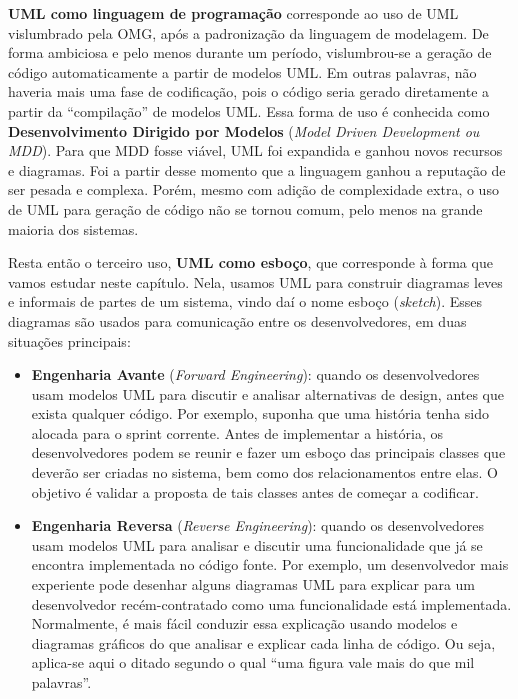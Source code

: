 \documentclass[
  11pt,
  twoside]{book}
\begin{document}
 \textbf{UML como linguagem de
programação} corresponde ao uso de UML vislumbrado pela OMG, após a
padronização da linguagem de modelagem. De forma ambiciosa e pelo menos
durante um período, vislumbrou-se a geração de código automaticamente a
partir de modelos UML. Em outras palavras, não haveria mais uma fase de
codificação, pois o código seria gerado diretamente a partir da
``compilação'' de modelos UML. Essa forma de uso é conhecida como
\textbf{Desenvolvimento Dirigido por Modelos} (\emph{Model Driven
Development ou MDD}). Para que MDD fosse viável, UML foi expandida e
ganhou novos recursos e diagramas. Foi a partir desse momento que a
linguagem ganhou a reputação de ser pesada e complexa. Porém, mesmo com
adição de complexidade extra, o uso de UML para geração de código não se
tornou comum, pelo menos na grande maioria dos sistemas.

 Resta então o terceiro uso, \textbf{UML como
esboço}, que corresponde à forma que vamos estudar neste capítulo. Nela,
usamos UML para construir diagramas leves e informais de partes de um
sistema, vindo daí o nome esboço (\emph{sketch}). Esses diagramas são
usados para comunicação entre os desenvolvedores, em duas situações
principais:

\begin{itemize}
\item
  \textbf{Engenharia Avante} (\emph{Forward Engineering}):
    quando os
  desenvolvedores usam modelos UML para discutir e analisar alternativas
  de design, antes que exista qualquer código. Por exemplo, suponha que
  uma história tenha sido alocada para o sprint corrente. Antes de
  implementar a história, os desenvolvedores podem se reunir e fazer um
  esboço das principais classes que deverão ser criadas no sistema, bem
  como dos relacionamentos entre elas. O objetivo é validar a proposta
  de tais classes antes de começar a codificar.
\item
  \textbf{Engenharia Reversa} (\emph{Reverse Engineering}):
    quando os
  desenvolvedores usam modelos UML para analisar e discutir uma
  funcionalidade que já se encontra implementada no código fonte. Por
  exemplo, um desenvolvedor mais experiente pode desenhar alguns
  diagramas UML para explicar para um desenvolvedor recém-contratado
  como uma funcionalidade está implementada. Normalmente, é mais fácil
  conduzir essa explicação usando modelos e diagramas gráficos do que
  analisar e explicar cada linha de código. Ou seja, aplica-se aqui o
  ditado segundo o qual ``uma figura vale mais do que mil palavras''.
\end{itemize}
\end{document}
